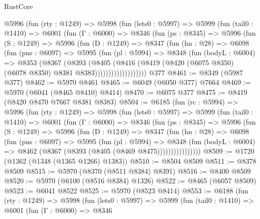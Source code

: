 \begin{lexlean}{RustCore}
\begin{coremodule}
{\begin{coremodule}
{{{{{{{{{{{{{{{{{{{{{{{{{{{{{{{{{{{{{{{{{{{{{      @5996
        (fun (rty : @1249) =>
        @5998
          (fun (lets0 : @5997) =>
          @5999
            (fun (tail0 : @1410) =>
            @6001
              (fun (Γ : @6000) =>
              @8346
                (fun (ps : @8345) =>
                @5996
                  (fun (S : @1249) =>
                  @5996
                    (fun (D : @1249) =>
                    @8347
                      (fun (hn : @28) =>
                      @6098
                        (fun (pns : @6097) =>
                        @5995
                          (fun (pl : @5994) =>
                          @8348
                            (fun (bodyL : @6004) =>
                            @8353
                              (@8367
                                (@8393
                                  (@8405
                                    (@8416
                                      (@8419
                                        (@8420
                                          (@6075 @8350)
                                          (@6078 @8350)
                                          @8381
                                          @8383)))))))))))))))))))
    @377
@8461 := @8349 (@5987 @377)
@8462 := @5970 @8461
@8465 := @6049 (@6050 @377) @7664
@8469 := @5970 (@6041 (@8465 @8410) @8414)
@8470 := @6075 @377
@8475 := @8419 (@8420 @8470 @7667 @8381 @8383)
@8504 := @6185
    (fun (rc : @5994) =>
    @5996
      (fun (rty : @1249) =>
      @5998
        (fun (lets0 : @5997) =>
        @5999
          (fun (tail0 : @1410) =>
          @6001
            (fun (Γ : @6000) =>
            @8346
              (fun (ps : @8345) =>
              @5996
                (fun (S : @1249) =>
                @5996
                  (fun (D : @1249) =>
                  @8347
                    (fun (hn : @28) =>
                    @6098
                      (fun (pns : @6097) =>
                      @5995
                        (fun (pl : @5994) =>
                        @8348
                          (fun (bodyL : @6004) =>
                          @8462 (@8367 (@8393 (@8405 (@8469 @8475))))))))))))))))
@8509 := @1720 (@1362 (@1348 (@1365 @1266) @1383))
@8510 := @8504 @8509
@8511 := @8378 @8509
@8515 := @5970 (@8370 (@8511 @8384) @8391)
@8516 := @8400 @8509
@8520 := @5970 (@6100 (@8516 @8384) @1326)
@8522 := @8465 (@6057 @8509)
@8523 := @6041 @8522
@8525 := @5970 (@8523 @8414)
@8553 := @6188
    (fun (rty : @1249) =>
    @5998
      (fun (lets0 : @5997) =>
      @5999
        (fun (tail0 : @1410) =>
        @6001
          (fun (Γ : @6000) =>
          @8346
}}}}}}}}}}}}}}}}}}}}}}}}}}}}}}}}}}}}}}}}}}}}}
\end{coremodule}}
\end{coremodule}
\end{lexlean}
